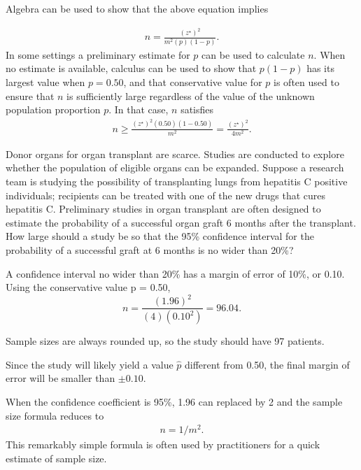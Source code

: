Algebra can be used to show that the above equation implies

\begin{align*}
n = \frac{(z^{\star})^2}{m^2(p)(1 - p)}.
\end{align*}
In some settings a preliminary estimate for $p$ can be used to calculate $n$.  When no estimate is available, calculus can be used to show that $p(1 - p)$ has its largest value when $p = 0.50$, and that conservative value for $p$ is often used to ensure that $n$ is sufficiently large regardless of the value of the unknown population proportion $p$.  In  that case, $n$ satisfies
\begin{align*}
  n \geq \frac{(z^{\star})^2(0.50)(1-0.50)}{m^2} = \frac{(z^{\star})^2}{4m^2}.
\end{align*}

\begin{example} {Donor organs for organ transplant are scarce. Studies are conducted to explore whether the population of eligible organs can be expanded. Suppose a research team is studying the possibility of transplanting lungs from hepatitis C positive individuals; recipients can be treated with one of the new drugs that cures hepatitis C. Preliminary studies in organ transplant are often designed to estimate the probability of a successful organ graft 6 months after the transplant.  How large should a study be so that the 95\% confidence interval for the probability of a successful graft at 6 months is no wider than 20\%?}

A confidence interval no wider than 20\% has a margin of error of 10\%, or 0.10.  Using the conservative value p = 0.50,
\[n = \frac{(1.96)^2}{(4)(0.10^2)} =  96.04.\]

Sample sizes are always rounded up, so the study should have 97 patients.  

Since the  study will likely yield a value $\hat{p}$ different from 0.50, the final margin of error will be smaller than $\pm 0.10$.

\end{example}

When the confidence coefficient is 95\%, 1.96 can replaced by 2 and the sample size formula reduces to 
\begin{align*}
  n = 1/m^2.
\end{align*}
This remarkably simple formula is often used by practitioners for a quick estimate of sample size.



